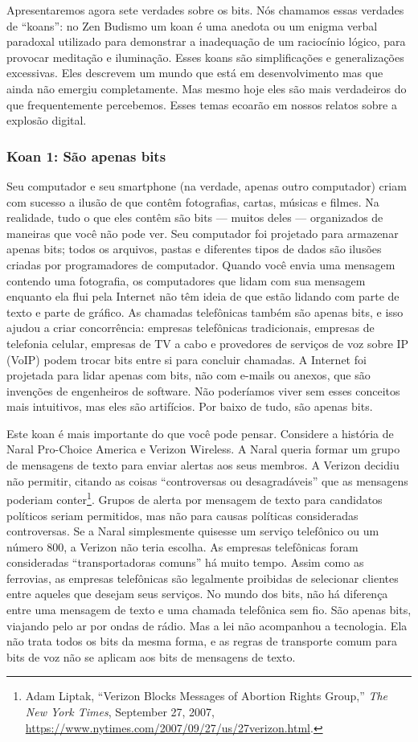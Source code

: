 Apresentaremos agora sete verdades sobre os bits. Nós chamamos essas verdades de
``koans'': no Zen Budismo um koan é uma anedota ou um enigma verbal paradoxal
utilizado para demonstrar a inadequação de um raciocínio lógico, para provocar
meditação e iluminação. Esses koans são simplificações e generalizações
excessivas. Eles descrevem um mundo que está em desenvolvimento mas que ainda
não emergiu completamente. Mas mesmo hoje eles são mais verdadeiros do que
frequentemente percebemos. Esses temas ecoarão em nossos relatos sobre a
explosão digital.


\subsubsection*{Koan 1: São apenas bits}
Seu computador e seu smartphone (na verdade, apenas outro computador) criam com 
sucesso a ilusão de que contêm fotografias, cartas, músicas e filmes. Na 
realidade, tudo o que eles contêm são bits --- muitos deles --- organizados de
maneiras que você não pode ver. Seu computador foi projetado para armazenar 
apenas bits; todos os arquivos, pastas e diferentes tipos de dados são ilusões 
criadas por programadores de computador. Quando você envia uma mensagem contendo 
uma fotografia, os computadores que lidam com sua mensagem enquanto ela flui 
pela Internet não têm ideia de que estão lidando com parte de texto e parte de 
gráfico. As chamadas telefônicas também são apenas bits, e isso ajudou a criar 
concorrência: empresas telefônicas tradicionais, empresas de telefonia celular, 
empresas de TV a cabo e provedores de serviços de voz sobre IP (VoIP) podem 
trocar bits entre si para concluir chamadas. A Internet foi projetada para lidar 
apenas com bits, não com e-mails ou anexos, que são invenções de engenheiros de 
software. Não poderíamos viver sem esses conceitos mais intuitivos, mas eles são 
artifícios. Por baixo de tudo, são apenas bits.

Este koan é mais importante do que você pode pensar. Considere a história de 
Naral Pro-Choice America e Verizon Wireless. A Naral queria formar um grupo de 
mensagens de texto para enviar alertas aos seus membros. A Verizon decidiu não 
permitir, citando as coisas ``controversas ou desagradáveis'' que as mensagens 
poderiam conter\footnote{Adam Liptak, ``Verizon Blocks Messages of Abortion
Rights Group,'' \textit{The New York Times}, September 27, 2007, \url{https://www.nytimes.com/2007/09/27/us/27verizon.html}.}. Grupos de alerta por mensagem de texto para candidatos 
políticos seriam permitidos, mas não para causas políticas consideradas 
controversas. Se a Naral simplesmente quisesse um serviço telefônico ou um 
número 800, a Verizon não teria escolha. As empresas telefônicas foram 
consideradas ``transportadoras comuns'' há muito tempo. Assim como as ferrovias, 
as empresas telefônicas são legalmente proibidas de selecionar clientes entre 
aqueles que desejam seus serviços. No mundo dos bits, não há diferença entre uma 
mensagem de texto e uma chamada telefônica sem fio. São apenas bits, viajando 
pelo ar por ondas de rádio. Mas a lei não acompanhou a tecnologia. Ela não 
trata todos os bits da mesma forma, e as regras de transporte comum para bits de 
voz não se aplicam aos bits de mensagens de texto.

